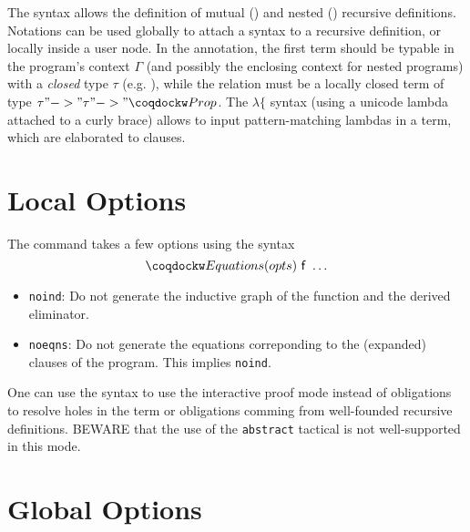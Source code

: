 The syntax allows the definition of mutual () and nested
() recursive definitions. Notations can be used globally to
attach a syntax to a recursive definition, or locally inside a user
node. In the  annotation, the first term should be typable in
the program's context $\Gamma$ (and possibly the enclosing context for
nested programs) with a \emph{closed} type $\tau$
(e.g. ), while the relation must be a locally closed term
of type $\tau "->" \tau "->" \kw{Prop}$.  The $\lambda\{$ syntax (using
a unicode lambda attached to a curly brace) allows to input
pattern-matching lambdas in a term, which are elaborated to 
clauses.

\section{Local Options}
The  command takes a few options using the syntax
\[\kw{Equations}(opts)~\cst{f}~\ldots\]

\begin{itemize}
\item \texttt{noind}: Do not generate the inductive graph of the
  function and the derived eliminator.
\item \texttt{noeqns}: Do not generate the equations correponding to the
  (expanded) clauses of the program. This implies \texttt{noind}.
\end{itemize}

One can use the  syntax to use the interactive proof mode
instead of obligations to resolve holes in the term or obligations
comming from well-founded recursive definitions. BEWARE that the use
of the \texttt{abstract} tactical is not well-supported in this mode.

\section{Global Options}

